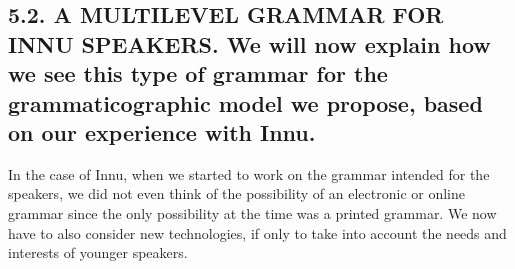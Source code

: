 \documentclass[letterpaper]{article}
\begin{document}
\subsection[5.2. A MULTILEVEL GRAMMAR FOR INNU SPEAKERS. We will now explain how we see this type of grammar for the grammaticographic model we propose, based on our experience \ with Innu. ]{5.2. A MULTILEVEL GRAMMAR FOR INNU SPEAKERS. \textmd{We will now explain how we see th}\textmd{is }\textmd{type of grammar for the grammaticographic model we propose, based on our experience }\textmd{ with }\textmd{Innu. }}
In the case of Innu, when we started to work on the grammar intended for the speakers, we did not even think of the possibility of an electronic or online grammar since the only possibility at the time was a printed grammar. We now have to also consider new technologies, if only to take into account the needs and interests of younger speakers. 
\end{document}
